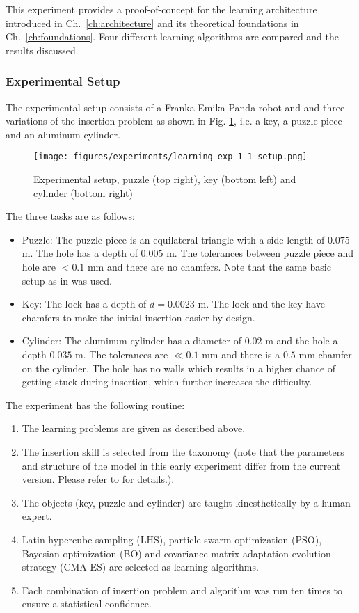 This experiment provides a proof-of-concept for the learning architecture introduced in Ch.~\ref{ch:architecture} and its theoretical foundations in Ch.~\ref{ch:foundations}.
Four different learning algorithms are compared and the results discussed.

\subsubsection{Experimental Setup}

The experimental setup consists of a Franka Emika Panda robot \cite{Haddadin.2017} and and three variations of the insertion problem as shown in Fig. \ref{fig:learning:exp_1_1:setup}, i.e. a key, a puzzle piece and an aluminum cylinder.

\begin{figure}[ht!]
\texttt{[image: figures/experiments/learning\_exp\_1\_1\_setup.png]}
\caption{Experimental setup, puzzle (top right), key (bottom left) and cylinder (bottom right)}
\label{fig:learning:exp_1_1:setup}
\end{figure}

The three tasks are as follows:
\begin{itemize}
\item Puzzle: The puzzle piece is an equilateral triangle with a side length of $0.075$ m.
The hole has a depth of $0.005$ m.
The tolerances between puzzle piece and hole are $< 0.1$ mm and there are no chamfers.
Note that the same basic setup as in \cite{Stemmer.2006} was used.
\item Key: The lock has a depth of $d=0.0023$ m.
The lock and the key have chamfers to make the initial insertion easier by design.
\item Cylinder: The aluminum cylinder has a diameter of $0.02$ m and the hole a depth $0.035$ m. The tolerances are $\ll 0.1$ mm and there is a $0.5$ mm chamfer on the cylinder.
The hole has no walls which results in a higher chance of getting stuck during insertion, which further increases the difficulty.
\end{itemize}

The experiment has the following routine:
\begin{enumerate}
\item The learning problems are given as described above.
\item The insertion skill is selected from the taxonomy (note that the parameters and structure of the \skillmodelabbr{} model in this early experiment differ from the current version. Please refer to \cite{Johannsmeier.2019} for details.).
\item The objects (key, puzzle and cylinder) are taught kinesthetically by a human expert.
\item Latin hypercube sampling (LHS), particle swarm optimization (PSO), Bayesian optimization (BO) and covariance matrix adaptation evolution strategy (CMA-ES) are selected as learning algorithms.
\item Each combination of insertion problem and algorithm was run ten times to ensure a statistical confidence.
\end{enumerate}

